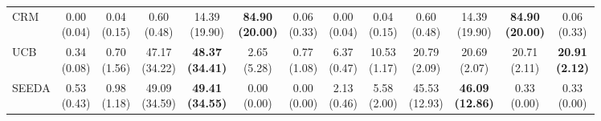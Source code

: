 {\begin{tabular}{l|cccccc|cccccc}
CRM & \makecell{0.00 \\ (0.04)} & \makecell{0.04 \\ (0.15)} & {\cellcolor[HTML]{C8E6C9}} \makecell{0.60 \\ (0.48)} & \makecell{14.39 \\ (19.90)} & \bfseries \makecell{84.90 \\ (20.00)} & \makecell{0.06 \\ (0.33)} & \makecell{0.00 \\ (0.04)} & \makecell{0.04 \\ (0.15)} & {\cellcolor[HTML]{C8E6C9}} \makecell{0.60 \\ (0.48)} & \makecell{14.39 \\ (19.90)} & \bfseries \makecell{84.90 \\ (20.00)} & \makecell{0.06 \\ (0.33)} \\
UCB & \makecell{0.34 \\ (0.08)} & \makecell{0.70 \\ (1.56)} & {\cellcolor[HTML]{C8E6C9}} \makecell{47.17 \\ (34.22)} & \bfseries \makecell{48.37 \\ (34.41)} & \makecell{2.65 \\ (5.28)} & \makecell{0.77 \\ (1.08)} & \makecell{6.37 \\ (0.47)} & \makecell{10.53 \\ (1.17)} & {\cellcolor[HTML]{C8E6C9}} \makecell{20.79 \\ (2.09)} & \makecell{20.69 \\ (2.07)} & \makecell{20.71 \\ (2.11)} & \bfseries \makecell{20.91 \\ (2.12)} \\
SEEDA & \makecell{0.53 \\ (0.43)} & \makecell{0.98 \\ (1.18)} & {\cellcolor[HTML]{C8E6C9}} \makecell{49.09 \\ (34.59)} & \bfseries \makecell{49.41 \\ (34.55)} & \makecell{0.00 \\ (0.00)} & \makecell{0.00 \\ (0.00)} & \makecell{2.13 \\ (0.46)} & \makecell{5.58 \\ (2.00)} & {\cellcolor[HTML]{C8E6C9}} \makecell{45.53 \\ (12.93)} & \bfseries \makecell{46.09 \\ (12.86)} & \makecell{0.33 \\ (0.00)} & \makecell{0.33 \\ (0.00)} \\

\end{tabular}}
